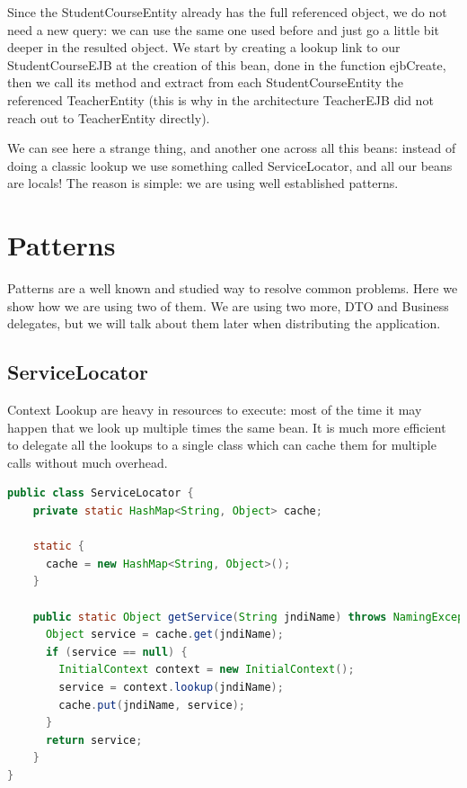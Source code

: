 \documentclass[12pt, a4paper]{article}
\begin{document}
  Since the StudentCourseEntity already has the full referenced object, we do not need a new query: we can use the same one used before and just go a little bit deeper in the resulted object. We start by creating a lookup link to our StudentCourseEJB at the creation of this bean, done in the function ejbCreate, then we call its method and extract from each StudentCourseEntity the referenced TeacherEntity (this is why in the architecture TeacherEJB did not reach out to TeacherEntity directly).

  We can see here a strange thing, and another one across all this beans: instead of doing a classic lookup we use something called ServiceLocator, and all our beans are locals! The reason is simple: we are using well established patterns.

  \pagebreak
  \section{Patterns}
  Patterns are a well known and studied way to resolve common problems. Here we show how we are using two of them. We are using two more, DTO and Business delegates, but we will talk about them later when distributing the application.
  
  \subsection{ServiceLocator}
  Context Lookup are heavy in resources to execute: most of the time it may happen that we look up multiple times the same bean. It is much more efficient to delegate all the lookups to a single class which can cache them for multiple calls without much overhead.
  \begin{lstlisting}[language=java, caption={ServiceLocator}]
    public class ServiceLocator {
    private static HashMap<String, Object> cache;

    static {
      cache = new HashMap<String, Object>();
    }

    public static Object getService(String jndiName) throws NamingException {
      Object service = cache.get(jndiName);
      if (service == null) {
        InitialContext context = new InitialContext();
        service = context.lookup(jndiName);
        cache.put(jndiName, service);
      }
      return service;
    }
}
  \end{lstlisting}
  
\end{document}
